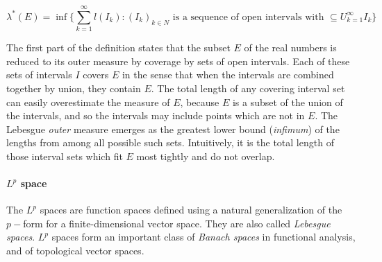 \begin{equation}
\lambda^*(E) = \inf\Bigg\{\sum_{k=1}^{\infty}l(I_k):(I_k)_{k\in N} \text{ is a sequence of open intervals with } \subseteq U_{k=1}^{\infty}I_k\Bigg\}
\end{equation}

The first part of the definition states that the subset $E$ of the real numbers is reduced to its outer measure by coverage by sets of open intervals. 
Each of these sets of intervals $I$ covers $E$ in the sense that when the intervals are combined together by union, they contain $E$. 
The total length of any covering interval set can easily overestimate the measure of $E$, because $E$ is a subset of the union of the intervals, and so the intervals may include points which are not in $E$. 
The Lebesgue \textit{outer} measure emerges as the greatest lower bound (\textit{infimum}) of the lengths from among all possible such sets. 
Intuitively, it is the total length of those interval sets which fit $E$ most tightly and do not overlap.


\paragraph{$L^p$ space}


The $L^p$ spaces are function spaces defined using a natural generalization of the $p-$form for a finite-dimensional vector space. 
They are also called \textit{Lebesgue spaces}. 
$L^p$ spaces form an important class of \textit{Banach spaces} in functional analysis, and of topological vector spaces.


